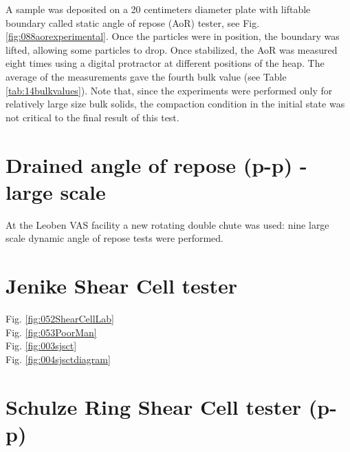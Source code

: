 

A sample was deposited on a 20 centimeters diameter plate with liftable
boundary called static angle of repose (\acs{AoR}) tester, see Fig. \ref{fig:088aorexperimental}.
Once the particles were in position, the boundary was lifted, allowing some particles to drop. 
Once stabilized, the \acs{AoR} was measured eight times using a digital protractor at different positions of the heap. 
The average of the measurements gave the fourth bulk value (see Table
\ref{tab:14bulkvalues}).
Note that, since the experiments were performed only for relatively large size
bulk solids, the compaction condition in the initial state was not critical to the
final result of this test.\\


\section{Drained angle of repose (p-p) - large scale}
\label{sec:aorlargescale}

At the Leoben VAS facility a new rotating double chute was used: 
nine large scale dynamic angle of repose tests were performed. 

\section{Jenike Shear Cell tester}
\label{sec:jsct}

Fig. \ref{fig:052ShearCellLab} \\
Fig. \ref{fig:053PoorMan} \\
Fig. \ref{fig:003sjsct} \\

Fig. \ref{fig:004sjsctdiagram} \\


\section{Schulze Ring Shear Cell tester (p-p)}
\label{sec:SRSCT}






